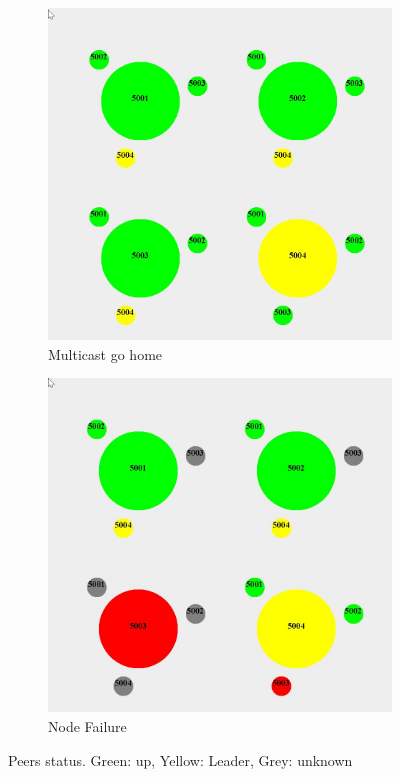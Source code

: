 \documentclass[10pt,letterpaper]{article}
\begin{document}
\begin{figure}[!t]
\begin{subfigure}{0.475\textwidth}
                \includegraphics[width=\textwidth]{images/gohome.jpeg}
                \caption{Multicast go home}
                \label{img:subB}
            \end{subfigure}
            \begin{subfigure}{0.5\textwidth}
                \centering
                \includegraphics[width=\textwidth]{images/failure.jpeg}
                \caption{Node Failure}
                \label{img:subC}
            \end{subfigure}
                \caption{Peers status. Green: up, Yellow: Leader, Grey: unknown}
                \label{img:peers_and_leader}
        \end{figure}
\end{document}
